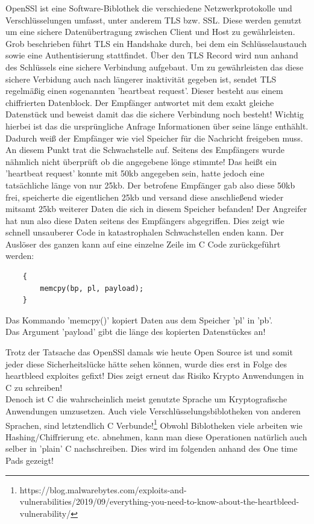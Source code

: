 \documentclass[a4paper,12pt]{scrartcl}
\begin{document}
OpenSSl ist eine Software-Biblothek die verschiedene Netzwerkprotokolle und Verschlüsselungen umfasst, unter anderem TLS bzw. SSL. Diese werden genutzt um eine sichere Datenübertragung  zwischen Client und Host zu gewährleisten. Grob beschrieben führt TLS ein Handshake durch, bei dem ein Schlüsselaustauch sowie eine Authentisierung stattfindet. Über den TLS Record wird nun anhand des Schlüssels eine sichere Verbindung aufgebaut. Um zu gewährleisten das diese sichere Verbidung auch nach längerer inaktivität gegeben ist, sendet TLS regelmäßig einen sogenannten 'heartbeat request'. Dieser besteht aus einem chiffrierten Datenblock. Der Empfänger antwortet mit dem exakt gleiche Datenstück und beweist damit das die sichere Verbindung noch besteht! Wichtig hierbei ist das die ursprüngliche Anfrage Informationen über seine länge enthählt. Dadurch weiß der Empfänger wie viel Speicher für die Nachricht freigeben muss. An diesem Punkt trat die Schwachstelle auf. Seitens des Empfängers wurde nähmlich nicht überprüft ob die angegebene lönge stimmte! Das heißt ein 'heartbeat request' konnte mit 50kb angegeben sein, hatte jedoch eine tatsächliche länge von nur 25kb. Der betrofene Empfänger gab also diese 50kb frei, speicherte die eigentlichen 25kb und versand diese anschließend wieder mitsamt 25kb weiterer Daten die sich in diesem Speicher befanden! Der Angreifer hat nun also diese Daten seitens des Empfängers abgegriffen. Dies zeigt wie schnell unsauberer Code in katastrophalen Schwachstellen enden kann. Der Auslöser des ganzen kann auf eine einzelne Zeile im C Code zurückgeführt werden:

\begin{center}
\begin{lstlisting}
	{
		memcpy(bp, pl, payload);
	}
\end{lstlisting}
Das Kommando 'memcpy()' kopiert Daten aus dem Speicher 'pl' in 'pb'.\\ Das Argument 'payload' gibt die länge des kopierten Datenstückes an!\\ 
\end{center}
Trotz der Tatsache das OpenSSl damals wie heute Open Source ist und somit jeder diese Sicherheitslücke hätte sehen können, wurde dies erst in Folge des heartbleed exploites gefixt! Dies zeigt erneut das Risiko Krypto Anwendungen in C zu schreiben!\\
Denoch ist C die wahrscheinlich meist genutzte Sprache um Kryptografische Anwendungen umzusetzen. Auch viele Verschlüsselungsbiblotheken von anderen Sprachen, sind letztendlich C Verbunde!\footnote{https://blog.malwarebytes.com/exploits-and-vulnerabilities/2019/09/everything-you-need-to-know-about-the-heartbleed-vulnerability/}
\vspace{2.5mm}
\newpage
Obwohl Biblotheken viele arbeiten wie Hashing/Chiffrierung etc. abnehmen, kann man diese Operationen natürlich auch selber in 'plain' C nachschreiben. Dies wird im folgenden anhand des One time Pads gezeigt! 
\end{document}
